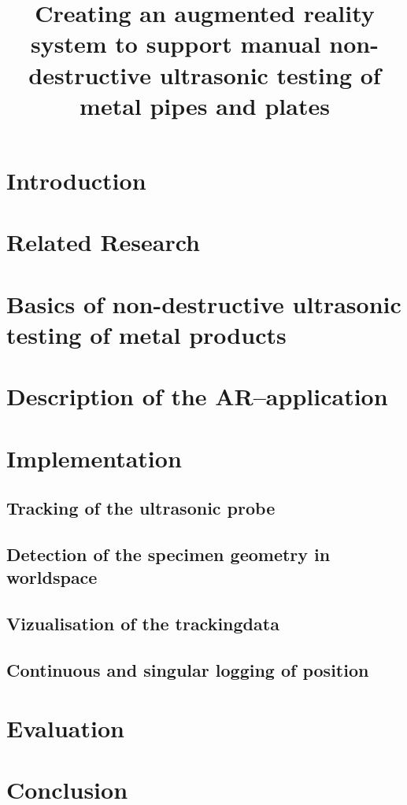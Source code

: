 \documentclass{VRARWorkshop}
\title{Creating an augmented reality system to support manual non-destructive ultrasonic testing of metal pipes and plates}
\begin{document}
\section{Introduction}

\section{Related Research}

\section{Basics of non-destructive ultrasonic testing of metal products}

\section{Description of the AR--application}

\section{Implementation}
\subsection{Tracking of the ultrasonic probe}

\subsection{Detection of the specimen geometry in worldspace}

\subsection{Vizualisation of the trackingdata}

\subsection{Continuous and singular logging of position}

\section{Evaluation}

\section{Conclusion}

\VRARsetbibstyle

\end{document}
